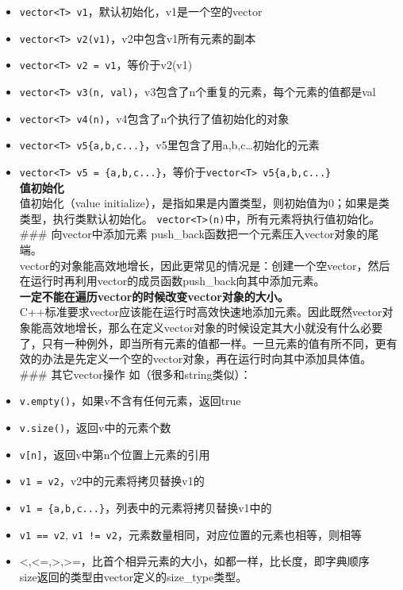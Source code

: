 \documentclass[
  a4paper,
  oneside,tablecaptionabove
]{scrbook}
\begin{document}
\begin{itemize}
\item
  \lstinline!vector<T> v1!，默认初始化，v1是一个空的vector\\
\item
  \lstinline!vector<T> v2(v1)!，v2中包含v1所有元素的副本\\
\item
  \lstinline!vector<T> v2 = v1!，等价于v2(v1)\\
\item
  \lstinline!vector<T> v3(n, val)!，v3包含了n个重复的元素，每个元素的值都是val\\
\item
  \lstinline!vector<T> v4(n)!，v4包含了n个执行了值初始化的对象\\
\item
  \lstinline!vector<T> v5{a,b,c...}!，v5里包含了用a,b,c\ldots{}初始化的元素\\
\item
  \lstinline!vector<T> v5 = {a,b,c...}!，等价于\lstinline!vector<T> v5{a,b,c...}!\\
  \textbf{值初始化}\\
  值初始化（value
  initialize），是指如果是内置类型，则初始值为0；如果是类类型，执行类默认初始化。
  \lstinline!vector<T>(n)!中，所有元素将执行值初始化。 \#\#\#
  向vector中添加元素 push\_back函数把一个元素压入vector对象的尾端。\\
  vector的对象能高效地增长，因此更常见的情况是：创建一个空vector，然后在运行时再利用vector的成员函数push\_back向其中添加元素。\\
  \textbf{一定不能在遍历vector的时候改变vector对象的大小。}\\
  C++标准要求vector应该能在运行时高效快速地添加元素。因此既然vector对象能高效地增长，那么在定义vector对象的时候设定其大小就没有什么必要了，只有一种例外，即当所有元素的值都一样。一旦元素的值有所不同，更有效的办法是先定义一个空的vector对象，再在运行时向其中添加具体值。\\
  \#\#\# 其它vector操作 如（很多和string类似）：
\item
  \lstinline!v.empty()!，如果v不含有任何元素，返回true\\
\item
  \lstinline!v.size()!，返回v中的元素个数\\
\item
  \lstinline!v[n]!，返回v中第n个位置上元素的引用\\
\item
  \lstinline!v1 = v2!，v2中的元素将拷贝替换v1的\\
\item
  \lstinline!v1 = {a,b,c...}!，列表中的元素将拷贝替换v1中的\\
\item
  \lstinline!v1 == v2!,
  \lstinline"v1 != v2"，元素数量相同，对应位置的元素也相等，则相等\\
\item
  \textless{},\textless{}=,\textgreater{},\textgreater{}=，比首个相异元素的大小，如都一样，比长度，即字典顺序\\
  size返回的类型由vector定义的size\_type类型。


\end{itemize}
\end{document}
